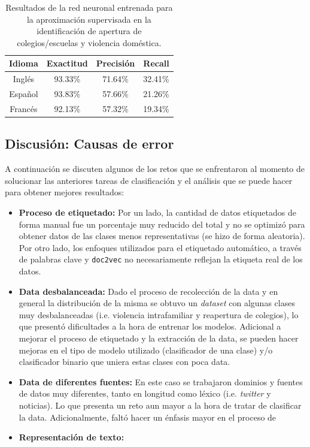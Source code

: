 \begin{table}[H]
    \centering
    \begin{tabular}{|c|c|c|c|}
        \textbf{Idioma} & \textbf{Exactitud} & \textbf{Precisión} & \textbf{Recall} \\ \hline
        Inglés & 93.33\% & 71.64\% & 32.41\% \\
        Español & 93.83\% & 57.66\% & 21.26\% \\
        Francés & 92.13\% & 57.32\% & 19.34\% \\
    \end{tabular}
    \caption{Resultados de la red neuronal entrenada para la aproximación supervisada en la identificación de apertura de colegios/escuelas y violencia doméstica.}
    \label{tab:dc_supervised_metrics_3}
\end{table}

\subsection{Discusión: Causas de error}

A continuación se discuten algunos de los retos que se enfrentaron al momento de solucionar las anteriores tareas de clasificación y el análisis que se puede hacer para obtener mejores resultados:

\begin{itemize}
    \item \textbf{Proceso de etiquetado:} Por un lado, la cantidad de datos etiquetados de forma manual fue un porcentaje muy reducido del total y no se optimizó para obtener datos de las clases menos representativas (se hizo de forma aleatoria). Por otro lado, los enfoques utilizados para el etiquetado automático, a través de palabras clave y \texttt{doc2vec} no necesariamente reflejan la etiqueta real de los datos.
    
    \item \textbf{Data desbalanceada:} Dado el proceso de recolección de la data y en general la distribución de la misma se obtuvo un \textit{dataset} con algunas clases muy desbalanceadas (i.e. violencia intrafamiliar y reapertura de colegios), lo que presentó dificultades a la hora de entrenar los modelos. Adicional a mejorar el proceso de etiquetado y la extracción de la data, se pueden hacer mejoras en el tipo de modelo utilizado (clasificador de una clase) y/o clasificador binario que uniera estas clases con poca data.
    
    \item \textbf{Data de diferentes fuentes:} En este caso se trabajaron dominios y fuentes de datos muy diferentes, tanto en longitud como léxico (i.e. \textit{twitter} y noticias). Lo que presenta un reto aun mayor a la hora de tratar de clasificar la data. Adicionalmente, faltó hacer un énfasis mayor en el proceso de 
    
    \item \textbf{Representación de texto:}
\end{itemize}

